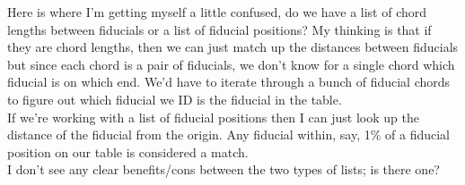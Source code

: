 \documentclass[10pt]{scrartcl}
\begin{document}
Here is where I'm getting myself a little confused, do we have a list of chord lengths between fiducials or a list of fiducial positions? My thinking is that if they are chord lengths, then we can just match up the distances between fiducials but since each chord is a pair of fiducials, we don't know for a single chord which fiducial is on which end. We'd have to iterate through a bunch of fiducial chords to figure out which fiducial we ID is the fiducial in the table. \\

If we're working with a list of fiducial positions then I can just look up the distance of the fiducial from the origin. Any fiducial within, say, 1\% of a fiducial position on our table is considered a match.\\

I don't see any clear benefits/cons between the two types of lists; is there one?
\end{document}
